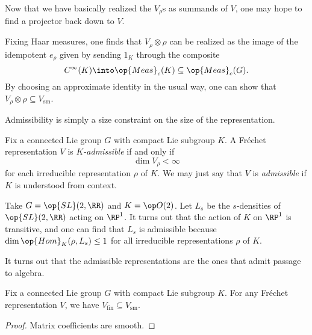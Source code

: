 \documentclass[../notes.tex]{subfiles}
\begin{document}
Now that we have basically realized the $V_\rho$s as summands of $V$, one may hope to find a projector back down to $V$.
\begin{lemma}
	
\end{lemma}
\begin{remark}
	Fixing Haar measures, one finds that $V_\rho\otimes\rho$ can be realized as the image of the idempotent $e_\rho$ given by sending $1_K$ through the composite
	\[C^\infty(K)\into\op{Meas}_c(K)\subseteq\op{Meas}_c(G).\]
	By choosing an approximate identity in the usual way, one can show that $V_\rho\otimes\rho\subseteq V_{\mathrm{sm}}$.
\end{remark}
Admissibility is simply a size constraint on the size of the representation.
\begin{definition}[admissible]
	Fix a connected Lie group $G$ with compact Lie subgroup $K$. A Fr\'echet representation $V$ is \textit{$K$-admissible} if and only if
	\[\dim V_\rho<\infty\]
	for each irreducible representation $\rho$ of $K$. We may just say that $V$ is \textit{admissible} if $K$ is understood from context.
\end{definition}
\begin{example}
	Take $G=\op{SL}(2,\RR)$ and $K=\op O(2)$. Let $L_s$ be the $s$-densities of $\op{SL}(2,\RR)$ acting on $\RP^1$. It turns out that the action of $K$ on $\RP^1$ is transitive, and one can find that $L_s$ is admissible because $\dim\op{Hom}_K(\rho,L_s)\le1$ for all irreducible representations $\rho$ of $K$.
\end{example}
It turns out that the admissible representations are the ones that admit passage to algebra.
\begin{lemma}
	Fix a connected Lie group $G$ with compact Lie subgroup $K$. For any Fr\'echet representation $V$, we have $V_{\mathrm{fin}}\subseteq V_{\mathrm{sm}}$.
\end{lemma}
\begin{proof}
	Matrix coefficients are smooth.
\end{proof}
\end{document}

